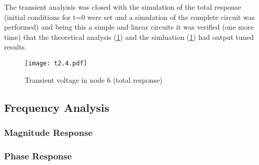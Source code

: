 The transient analyisis was closed with the simulation of the total response (initial conditions for t=0 were set and a simulation of the complete circuit was performed) and being this a simple and linear circuits it was verified (one more time) that the theoretical analysis (\ref{fig:trans2}) and the simluation (\ref{fig:trans2}) had output tuned results.

\begin{figure}[h] \centering
\texttt{[image: t2.4.pdf]}
\caption{Transient voltage in node 6 (total response)}
\label{fig:trans2}
\end{figure}





\subsection{Frequency Analysis}

\subsubsection{Magnitude Response}




\subsubsection{Phase Response}




